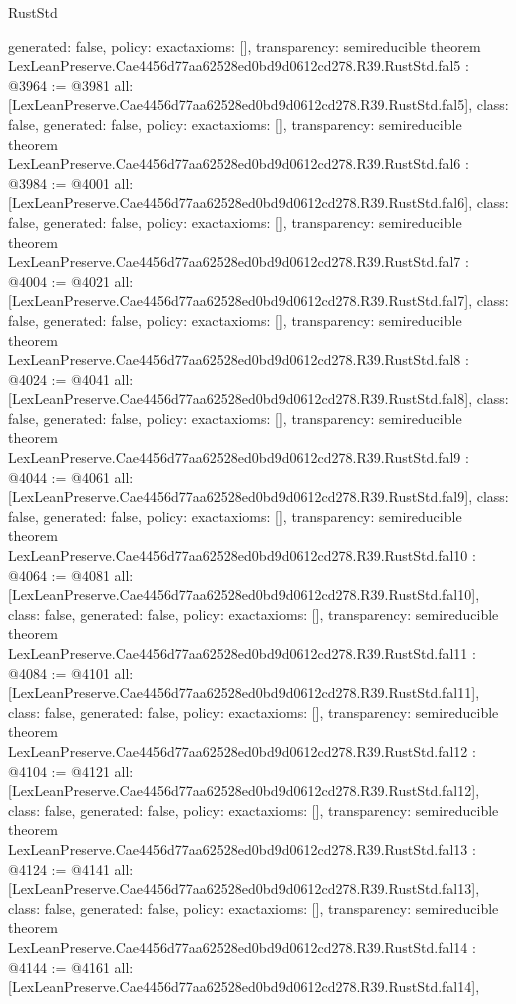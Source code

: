 \begin{lexlean}{RustStd}
\begin{coremodule}
{  generated: false,
  policy: exact{axioms: []},
  transparency: semireducible
}
theorem LexLeanPreserve.Cae4456d77aa62528ed0bd9d0612cd278.R39.RustStd.fal5 : @3964 := @3981 {
  all: [LexLeanPreserve.Cae4456d77aa62528ed0bd9d0612cd278.R39.RustStd.fal5],
  class: false,
  generated: false,
  policy: exact{axioms: []},
  transparency: semireducible
}
theorem LexLeanPreserve.Cae4456d77aa62528ed0bd9d0612cd278.R39.RustStd.fal6 : @3984 := @4001 {
  all: [LexLeanPreserve.Cae4456d77aa62528ed0bd9d0612cd278.R39.RustStd.fal6],
  class: false,
  generated: false,
  policy: exact{axioms: []},
  transparency: semireducible
}
theorem LexLeanPreserve.Cae4456d77aa62528ed0bd9d0612cd278.R39.RustStd.fal7 : @4004 := @4021 {
  all: [LexLeanPreserve.Cae4456d77aa62528ed0bd9d0612cd278.R39.RustStd.fal7],
  class: false,
  generated: false,
  policy: exact{axioms: []},
  transparency: semireducible
}
theorem LexLeanPreserve.Cae4456d77aa62528ed0bd9d0612cd278.R39.RustStd.fal8 : @4024 := @4041 {
  all: [LexLeanPreserve.Cae4456d77aa62528ed0bd9d0612cd278.R39.RustStd.fal8],
  class: false,
  generated: false,
  policy: exact{axioms: []},
  transparency: semireducible
}
theorem LexLeanPreserve.Cae4456d77aa62528ed0bd9d0612cd278.R39.RustStd.fal9 : @4044 := @4061 {
  all: [LexLeanPreserve.Cae4456d77aa62528ed0bd9d0612cd278.R39.RustStd.fal9],
  class: false,
  generated: false,
  policy: exact{axioms: []},
  transparency: semireducible
}
theorem LexLeanPreserve.Cae4456d77aa62528ed0bd9d0612cd278.R39.RustStd.fal10 : @4064 := @4081 {
  all: [LexLeanPreserve.Cae4456d77aa62528ed0bd9d0612cd278.R39.RustStd.fal10],
  class: false,
  generated: false,
  policy: exact{axioms: []},
  transparency: semireducible
}
theorem LexLeanPreserve.Cae4456d77aa62528ed0bd9d0612cd278.R39.RustStd.fal11 : @4084 := @4101 {
  all: [LexLeanPreserve.Cae4456d77aa62528ed0bd9d0612cd278.R39.RustStd.fal11],
  class: false,
  generated: false,
  policy: exact{axioms: []},
  transparency: semireducible
}
theorem LexLeanPreserve.Cae4456d77aa62528ed0bd9d0612cd278.R39.RustStd.fal12 : @4104 := @4121 {
  all: [LexLeanPreserve.Cae4456d77aa62528ed0bd9d0612cd278.R39.RustStd.fal12],
  class: false,
  generated: false,
  policy: exact{axioms: []},
  transparency: semireducible
}
theorem LexLeanPreserve.Cae4456d77aa62528ed0bd9d0612cd278.R39.RustStd.fal13 : @4124 := @4141 {
  all: [LexLeanPreserve.Cae4456d77aa62528ed0bd9d0612cd278.R39.RustStd.fal13],
  class: false,
  generated: false,
  policy: exact{axioms: []},
  transparency: semireducible
}
theorem LexLeanPreserve.Cae4456d77aa62528ed0bd9d0612cd278.R39.RustStd.fal14 : @4144 := @4161 {
  all: [LexLeanPreserve.Cae4456d77aa62528ed0bd9d0612cd278.R39.RustStd.fal14],
}
\end{coremodule}
\end{lexlean}
